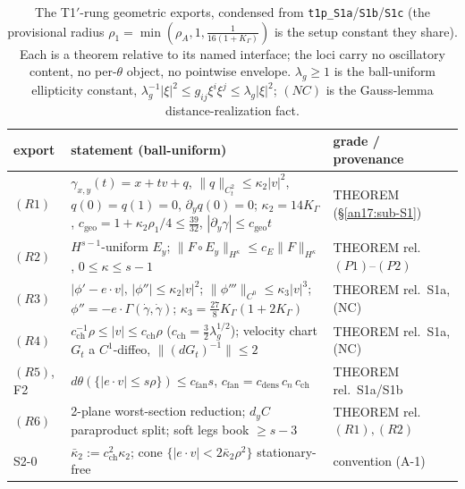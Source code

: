 \begin{table}[htbp]
\begin{center}
\small
\renewcommand{\arraystretch}{1.3}
\begin{tabular}{l p{} l}
\hline
export & statement (ball-uniform) & grade / provenance \\
\hline
$(R1)$ &
$\gamma_{x,y}(t)=x+tv+q$, $\|q\|_{C^2_t}\le\kappa_2|v|^2$, $q(0)=q(1)=0$,
$\partial_yq(0)=0$; $\kappa_2=14K_\Gamma$, $c_{\mathrm{geo}}=1+\kappa_2\rho_1/4
\le\tfrac{39}{32}$, $|\partial_y\gamma|\le c_{\mathrm{geo}}t$ &
THEOREM (\S\ref{an17:sub-S1}) \\
$(R2)$ &
$H^{s-1}$-uniform $E_y$; $\|F\circ E_y\|_{H^\kappa}\le c_E\|F\|_{H^\kappa}$,
$0\le\kappa\le s-1$ &
THEOREM rel.\ $(P1)$--$(P2)$ \\
$(R3)$ &
$|\phi'-e\cdot v|,\,|\phi''|\le\kappa_2|v|^2$; $\|\phi'''\|_{C^0}\le\kappa_3|v|^3$;
$\phi''=-e\cdot\Gamma(\dot\gamma,\dot\gamma)$; $\kappa_3=\tfrac{27}8K_\Gamma
(1+2K_\Gamma)$ &
THEOREM rel.\ S1a, (NC) \\
$(R4)$ &
$c_{\mathrm{ch}}^{-1}\rho\le|v|\le c_{\mathrm{ch}}\rho$
($c_{\mathrm{ch}}=\tfrac32\lambda_g^{1/2}$); velocity chart $G_t$ a $C^1$-diffeo,
$\|(dG_t)^{-1}\|\le2$ &
THEOREM rel.\ S1a, (NC) \\
$(R5)$, F2 &
$d\theta(\{|e\cdot v|\le s\rho\})\le c_{\mathrm{fan}}s$,
$c_{\mathrm{fan}}=c_{\mathrm{dens}}\,c_n\,c_{\mathrm{ch}}$ &
THEOREM rel.\ S1a/S1b \\
$(R6)$ &
2-plane worst-section reduction; $d_yC$ paraproduct split; soft legs book
$\ge s-3$ &
THEOREM rel.\ $(R1),(R2)$ \\
S2-0 &
$\bar\kappa_2:=c_{\mathrm{ch}}^2\kappa_2$; cone $\{|e\cdot v|<2\bar\kappa_2
\rho^2\}$ stationary-free &
convention (A-1) \\
\hline
\end{tabular}
\end{center}
\caption{The T1$'$-rung geometric exports, condensed from
\texttt{t1p\_S1a}/\texttt{S1b}/\texttt{S1c} (the provisional radius
$\rho_1=\min(\rho_A,1,\tfrac1{16(1+K_\Gamma)})$ is the setup constant they
share). Each is a theorem relative to its named interface; the loci carry no
oscillatory content, no per-$\theta$ object, no pointwise envelope. $\lambda_g
\ge1$ is the ball-uniform ellipticity constant, $\lambda_g^{-1}|\xi|^2\le
g_{ij}\xi^i\xi^j\le\lambda_g|\xi|^2$; $(NC)$ is the Gauss-lemma
distance-realization fact.}
\label{an17:tab-S1exports}
\end{table}

